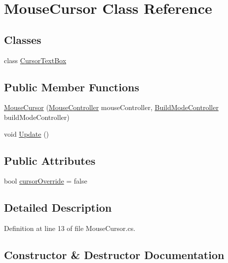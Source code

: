 \hypertarget{class_mouse_cursor}{}\section{Mouse\+Cursor Class Reference}
\label{class_mouse_cursor}
\subsection*{Classes}
\begin{DoxyCompactItemize}
\item 
class \hyperlink{class_mouse_cursor_1_1_cursor_text_box}{Cursor\+Text\+Box}
\end{DoxyCompactItemize}
\subsection*{Public Member Functions}
\begin{DoxyCompactItemize}
\item 
\hyperlink{class_mouse_cursor_ae58b539e9c827d2f7578947e493c6a80}{Mouse\+Cursor} (\hyperlink{class_mouse_controller}{Mouse\+Controller} mouse\+Controller, \hyperlink{class_build_mode_controller}{Build\+Mode\+Controller} build\+Mode\+Controller)
\item 
void \hyperlink{class_mouse_cursor_a6a2ef153df0c5594f0c53794fd48432f}{Update} ()
\end{DoxyCompactItemize}
\subsection*{Public Attributes}
\begin{DoxyCompactItemize}
\item 
bool \hyperlink{class_mouse_cursor_ae55c2e352643366bb71aa12bd73628c2}{cursor\+Override} = false
\end{DoxyCompactItemize}


\subsection{Detailed Description}


Definition at line 13 of file Mouse\+Cursor.\+cs.



\subsection{Constructor \& Destructor Documentation}
\mbox{\label{class_mouse_cursor_ae58b539e9c827d2f7578947e493c6a80}} 
